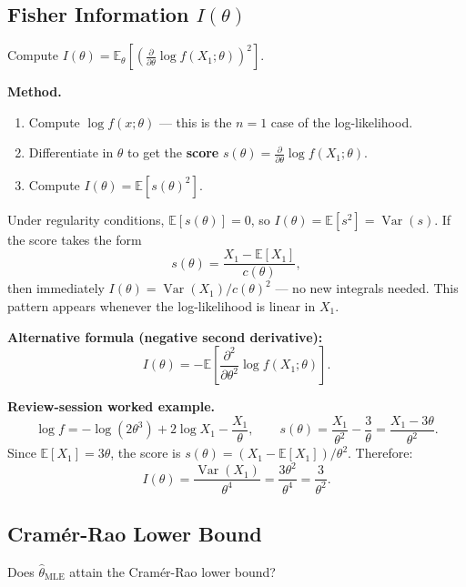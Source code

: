 \documentclass[11pt,a4paper]{article}
\newcommand{\pd}[2]{\frac{\partial #1}{\partial #2}}
\newcommand{\E}{\mathbb{E}}
\newcommand{\Var}{\operatorname{Var}}
\begin{document}
\subsection{Fisher Information $I(\theta)$}

\begin{tcolorbox}[questionbox, title={Question 6}]
Compute $I(\theta) = \E_\theta\!\left[\left(\pd{}{\theta}\log f(X_1;\theta)\right)^2\right]$.
\end{tcolorbox}

\textbf{Method.}
\begin{enumerate}[leftmargin=2em]
  \item Compute $\log f(x;\theta)$ — this is the $n=1$ case of the log-likelihood.
  \item Differentiate in $\theta$ to get the \textbf{score} $s(\theta) = \pd{}{\theta}\log f(X_1;\theta)$.
  \item Compute $I(\theta) = \E[s(\theta)^2]$.
\end{enumerate}

\begin{tcolorbox}[successbox, title={The variance shortcut (saves time on exam)}]
Under regularity conditions, $\E[s(\theta)] = 0$, so $I(\theta) = \E[s^2] = \Var(s)$. If the score takes the form
\[
  s(\theta) = \frac{X_1 - \E[X_1]}{c(\theta)},
\]
then immediately $I(\theta) = \Var(X_1)/c(\theta)^2$ — no new integrals needed. This pattern appears whenever the log-likelihood is linear in $X_1$.
\end{tcolorbox}

\textbf{Alternative formula (negative second derivative):}
\[
  I(\theta) = -\E\!\left[\pd{^2}{\theta^2}\log f(X_1;\theta)\right].
\]

\textbf{Review-session worked example.}
\[
  \log f = -\log(2\theta^3) + 2\log X_1 - \frac{X_1}{\theta}, \qquad
  s(\theta) = \frac{X_1}{\theta^2} - \frac{3}{\theta} = \frac{X_1 - 3\theta}{\theta^2}.
\]
Since $\E[X_1]=3\theta$, the score is $s(\theta) = (X_1 - \E[X_1])/\theta^2$. Therefore:
\[
  I(\theta) = \frac{\Var(X_1)}{\theta^4} = \frac{3\theta^2}{\theta^4} = \frac{3}{\theta^2}.
\]

\subsection{Cramér-Rao Lower Bound}

\begin{tcolorbox}[questionbox, title={Question 7}]
Does $\hat\theta_{\text{MLE}}$ attain the Cramér-Rao lower bound?
\end{tcolorbox}
\end{document}

